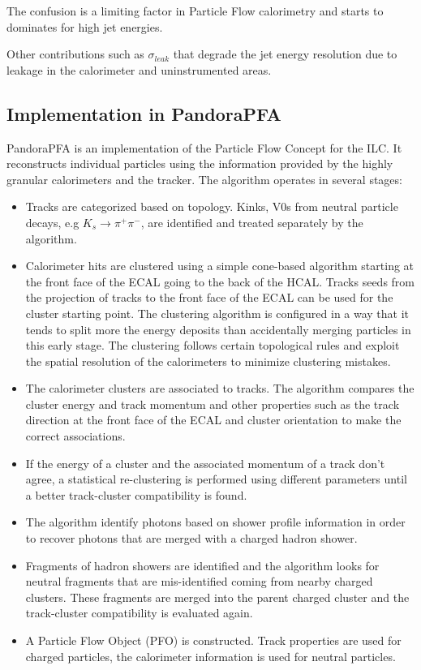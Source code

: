 The confusion is a limiting factor in Particle Flow calorimetry and starts to dominates for high jet energies.

Other contributions such as $\sigma_{leak}$ that degrade the jet energy resolution due to leakage in the calorimeter and uninstrumented areas.

\subsection{Implementation in PandoraPFA}

PandoraPFA \cite{Thomson:2009rp, Marshall2013} is an implementation of the Particle Flow Concept for the ILC. It reconstructs individual particles using the information provided by the highly granular calorimeters and the tracker. The algorithm operates in several stages:

\begin{itemize}
  \item Tracks are categorized based on topology. Kinks, V0s from neutral particle decays, e.g $K_s \rightarrow \pi^+\pi^-$, are identified and treated separately by the algorithm.
  \item Calorimeter hits are clustered using a simple cone-based algorithm starting at the front face of the ECAL going to the back of the HCAL. Tracks seeds from the projection of tracks to the front face of the ECAL can be used for the cluster starting point. The clustering algorithm is configured in a way that it tends to split more the energy deposits than accidentally merging particles in this early stage. The clustering follows certain topological rules and exploit the spatial resolution of the calorimeters to minimize clustering mistakes.
  \item The calorimeter clusters are associated to tracks. The algorithm compares the cluster energy and track momentum and other properties such as the track direction at the front face of the ECAL and cluster orientation to make the correct associations.
  \item If the energy of a cluster and the associated momentum of a track don't agree, a statistical re-clustering is performed using different parameters until a better track-cluster compatibility is found.
  \item The algorithm identify photons based on shower profile information in order to recover photons that are merged with a charged hadron shower.
  \item Fragments of hadron showers are identified and the algorithm looks for neutral fragments that are mis-identified coming from nearby charged clusters. These fragments are merged into the parent charged cluster and the track-cluster compatibility is evaluated again.
  \item A Particle Flow Object (PFO) is constructed. Track properties are used for charged particles, the calorimeter information is used for neutral particles.
\end{itemize}

